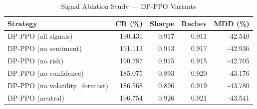 \begin{table}[htbp]
\centering
\caption{Signal Ablation Study — DP-PPO Variants}
\label{tab:ablation}
\begin{tabular}{lrrrr}
\toprule
\textbf{Strategy} & \textbf{CR (\%)} & \textbf{Sharpe} & \textbf{Rachev} & \textbf{MDD (\%)} \\
\midrule
DP-PPO (all signals) & 190.431 & 0.917 & 0.911 & -42.540 \\
DP-PPO (no sentiment) & 191.113 & 0.913 & 0.917 & -42.936 \\
DP-PPO (no risk) & 190.787 & 0.915 & 0.915 & -42.705 \\
DP-PPO (no confidence) & 185.075 & 0.893 & 0.920 & -43.176 \\
DP-PPO (no volatility\_forecast) & 186.568 & 0.896 & 0.919 & -43.780 \\
DP-PPO (neutral) & 196.754 & 0.926 & 0.921 & -43.541 \\
\bottomrule
\end{tabular}
\end{table}